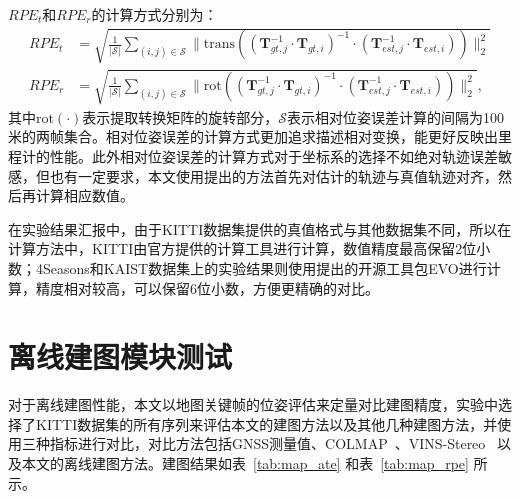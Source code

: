 $RPE_{t}$和$RPE_{r}$的计算方式分别为：
\begin{align}
  RPE_{t} &= \sqrt{\frac{1}{|\mathcal{S}|}\sum_{(i,j) \in \mathcal{S}}\| \text{trans}\left ((\symbf{T}_{gt,j}^{-1} \cdot \symbf{T}_{gt,i})^{-1}\cdot (\symbf{T}_{est,j}^{-1} \cdot \symbf{T}_{est,i}) \right ) \|_2^2} \\
  RPE_{r} &= \sqrt{\frac{1}{|\mathcal{S}|}\sum_{(i,j) \in \mathcal{S}}\| \text{rot}\left ((\symbf{T}_{gt,j}^{-1} \cdot \symbf{T}_{gt,i})^{-1}\cdot (\symbf{T}_{est,j}^{-1} \cdot \symbf{T}_{est,i}) \right ) \|_2^2},
\end{align}
其中$\text{rot}(\cdot)$表示提取转换矩阵的旋转部分，$\mathcal{S}$表示相对位姿误差计算的间隔为100米的两帧集合。相对位姿误差的计算方式更加追求描述相对变换，能更好反映出里程计的性能。此外相对位姿误差的计算方式对于坐标系的选择不如绝对轨迹误差敏感，但也有一定要求，本文使用\citet{li2023textslam}提出的方法首先对估计的轨迹与真值轨迹对齐，然后再计算相应数值。

在实验结果汇报中，由于KITTI数据集提供的真值格式与其他数据集不同，所以在计算方法中，KITTI由官方提供的计算工具进行计算，数值精度最高保留2位小数；4Seasons和KAIST数据集上的实验结果则使用\citet{grupp2017evo}提出的开源工具包EVO进行计算，精度相对较高，可以保留6位小数，方便更精确的对比。

\section{离线建图模块测试}
对于离线建图性能，本文以地图关键帧的位姿评估来定量对比建图精度，实验中选择了KITTI数据集的所有序列来评估本文的建图方法以及其他几种建图方法，并使用三种指标进行对比，对比方法包括GNSS测量值、COLMAP~\cite{schonberger2016structure}、VINS-Stereo~\cite{qin2019a} 以及本文的离线建图方法。建图结果如表~\ref{tab:map_ate} 和表~\ref{tab:map_rpe} 所示。

